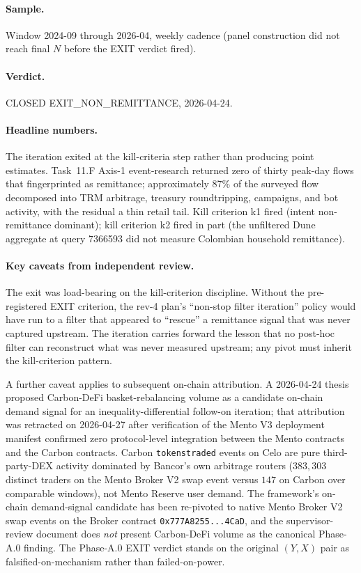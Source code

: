 \paragraph{Sample.} Window 2024-09 through 2026-04, weekly cadence
(panel construction did not reach final \(N\) before the EXIT verdict
fired).

\paragraph{Verdict.} CLOSED EXIT\_NON\_REMITTANCE, 2026-04-24.

\paragraph{Headline numbers.} The iteration exited at the kill-criteria
step rather than producing point estimates. Task~11.F Axis-1
event-research returned zero of thirty peak-day flows that fingerprinted
as remittance; approximately 87\% of the surveyed flow decomposed into
TRM arbitrage, treasury roundtripping, campaigns, and bot activity, with
the residual a thin retail tail. Kill criterion k1 fired (intent
non-remittance dominant); kill criterion k2 fired in part (the
unfiltered Dune aggregate at query 7366593 did not measure Colombian
household remittance).

\paragraph{Key caveats from independent review.} The exit was load-bearing
on the kill-criterion discipline. Without the pre-registered EXIT
criterion, the rev-4 plan's ``non-stop filter iteration'' policy would
have run to a filter that appeared to ``rescue'' a remittance signal
that was never captured upstream. The iteration carries forward the
lesson that no post-hoc filter can reconstruct what was never measured
upstream; any pivot must inherit the kill-criterion pattern.

A further caveat applies to subsequent on-chain attribution. A
2026-04-24 thesis proposed Carbon-DeFi basket-rebalancing volume as a
candidate on-chain demand signal for an inequality-differential
follow-on iteration; that attribution was retracted on 2026-04-27 after
verification of the Mento V3 deployment manifest confirmed zero
protocol-level integration between the Mento contracts and the Carbon
contracts. Carbon \texttt{tokenstraded} events on Celo are pure
third-party-DEX activity dominated by Bancor's own arbitrage routers
(\(383{,}303\) distinct traders on the Mento Broker V2 swap event versus
\(147\) on Carbon over comparable windows), not Mento Reserve user
demand. The framework's on-chain demand-signal candidate has been
re-pivoted to native Mento Broker V2 swap events on the Broker contract
\texttt{0x777A8255...4CaD}, and the supervisor-review document does
\emph{not} present Carbon-DeFi volume as the canonical Phase-A.0
finding. The Phase-A.0 EXIT verdict stands on the original
\((Y, X)\) pair as falsified-on-mechanism rather than failed-on-power.

